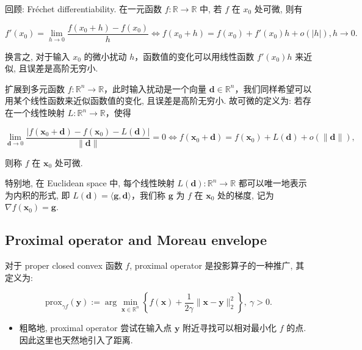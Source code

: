 \begin{remarkblock}
回顾: Fréchet differentiability. 在一元函数 $f: \mathbb{R} \to \mathbb{R}$ 中, 若 $f$ 在 $x_0$ 处可微, 则有

\[
f'(x_0) = \lim_{h \to 0} \frac{f(x_0+h)-f(x_0)}{h} \iff f(x_0+h) = f(x_0) + f'(x_0)h + o(|h|), h \to 0.
\]

换言之, 对于输入 $x_0$ 的微小扰动 $h$，函数值的变化可以用线性函数 $f'(x_0)h$ 来近似, 且误差是高阶无穷小.

扩展到多元函数 $f: \mathbb{R}^n \to \mathbb{R}$，此时输入扰动是一个向量 $\bm{d} \in \mathbb{R}^n$，我们同样希望可以用某个线性函数来近似函数值的变化, 且误差是高阶无穷小. 故可微的定义为: 若存在一个线性映射 $L : \mathbb{R}^n \to \mathbb{R}$，使得

\[
\lim_{\bm{d} \to 0} \frac{|f(\bm{x}_0 + \bm{d}) - f(\bm{x}_0) - L(\bm{d})|}{\|\bm{d}\|} = 0 \iff f(\bm{x}_0 + \bm{d}) = f(\bm{x}_0) + L(\bm{d}) + o(\|\bm{d}\|),
\]

则称 $f$ 在 $\bm{x}_0$ 处可微.

特别地, 在 Euclidean space 中, 每个线性映射 $L(\bm{d}): \mathbb{R}^n \to \mathbb{R}$ 都可以唯一地表示为内积的形式, 即 $L(\bm{d}) = \langle \bm{g}, \bm{d} \rangle$，我们称 $\bm{g}$ 为 $f$ 在 $\bm{x}_0$ 处的梯度, 记为 $\nabla f(\bm{x}_0) = \bm{g}$.

\end{remarkblock}

\subsection{Proximal operator and Moreau envelope}


\begin{defblock}
对于 proper closed convex 函数 $f$, proximal operator 是投影算子的一种推广, 其定义为:

\[
\text{prox}_{\gamma f}(\bm{y}) := \arg\min_{\bm{x} \in \mathbb{R}^n} \left\{f(\bm{x}) + \frac{1}{2\gamma}\|\bm{x}-\bm{y}\|_2^2\right\},~ \gamma > 0.
\]

\end{defblock}

\begin{itemize}
\item {}粗略地, proximal operator 尝试在输入点 $\bm{y}$ 附近寻找可以相对最小化 $f$ 的点. 因此这里也天然地引入了距离.


\end{itemize}


